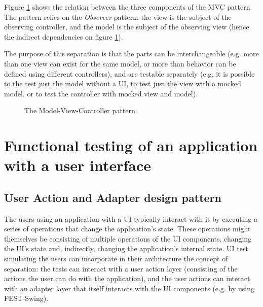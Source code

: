 Figure \ref{fig:mvc_pattern} shows the relation between the three components of the MVC pattern. The pattern relies on the \emph{Observer} pattern: the view is the subject of the observing controller, and the model is the subject of the observing view (hence the indirect dependencies on figure \ref{fig:mvc_pattern}).

The purpose of this separation is that the parts can be interchangeable (e.g. more than one view can exist for the same model, or more than behavior can be defined using different controllers), and are testable separately (e.g. it is possible to the test just the model without a UI, to test just the view with a mocked model, or to test the controller with mocked view and model).

\begin{figure}[h!]
\centering
{}
\caption{The Model-View-Controller pattern.}
\label{fig:mvc_pattern}
\end{figure}

\section{Functional testing of an application with a user interface}\label{sec:theory_functional-ui-testing}

\subsection{User Action and Adapter design pattern}\label{sec:user-actions-adapters}

The users using an application with a UI typically interact with it by executing a series of operations that change the application's state. These operations might themselves be consisting of multiple operations of the UI components, changing the UI's state and, indirectly, changing the application's internal state. UI test simulating the users can incorporate in their architecture the concept of separation: the tests can interact with a user action layer (consisting of the actions the user can do with the application), and the user actions can interact with an adapter layer that itself interacts with the UI components (e.g. by using FEST-Swing).

